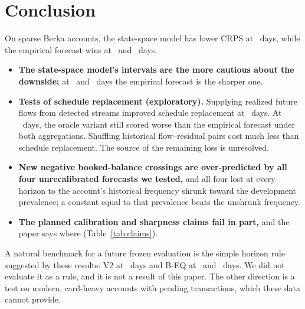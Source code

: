 \section{Conclusion}
\label{sec:conclusion}

On sparse Berka accounts, the state-space model has lower CRPS at \hA\
days, while the empirical forecast wins at \hB\ and \hC\ days.
\begin{itemize}
\item \textbf{The state-space model's intervals are the more cautious about
  the downside;} at \hB\ and \hC\ days the empirical forecast is the
  sharper one.
\item \textbf{Tests of schedule replacement (exploratory).} Supplying
  realized future flows from detected streams improved schedule
  replacement at \hB\ days. At \hC\ days, the oracle variant still scored
  worse than the empirical forecast under both aggregations. Shuffling
  historical flow--residual pairs cost much less than schedule
  replacement. The source of the remaining loss is unresolved.
\item \textbf{New negative booked-balance crossings are over-predicted by
  all four unrecalibrated forecasts we tested,} and all four lost at
  every horizon to the account's historical frequency shrunk toward the
  development prevalence; a constant equal to that prevalence beats the
  unshrunk frequency.
\item \textbf{The planned calibration and sharpness claims fail in
  part,} and the paper says where (Table~\ref{tab:claims}).
\end{itemize}
A natural benchmark for a future frozen evaluation is the simple horizon
rule suggested by these results: V2 at \hA\ days and B-EQ at \hB\ and \hC\
days. We did not evaluate it as a rule, and it is not a result of this
paper. The other direction is a test on modern, card-heavy accounts with
pending transactions, which these data cannot provide.

